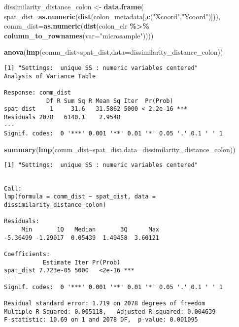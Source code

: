 \documentclass[
]{article}
\newenvironment{Shaded}{\begin{snugshade}}{\end{snugshade}}
\newcommand{\AttributeTok}[1]{\textcolor[rgb]{0.13,0.29,0.53}{#1}}
\newcommand{\FunctionTok}[1]{\textcolor[rgb]{0.13,0.29,0.53}{\textbf{#1}}}
\newcommand{\NormalTok}[1]{#1}
\newcommand{\OtherTok}[1]{\textcolor[rgb]{0.56,0.35,0.01}{#1}}
\newcommand{\SpecialCharTok}[1]{\textcolor[rgb]{0.81,0.36,0.00}{\textbf{#1}}}
\newcommand{\StringTok}[1]{\textcolor[rgb]{0.31,0.60,0.02}{#1}}
\begin{document}
\begin{Shaded}
\begin{Highlighting}[]
\NormalTok{dissimilarity\_distance\_colon }\OtherTok{\textless{}{-}} \FunctionTok{data.frame}\NormalTok{(}
        \AttributeTok{spat\_dist=}\FunctionTok{as.numeric}\NormalTok{(}\FunctionTok{dist}\NormalTok{(colon\_metadata[,}\FunctionTok{c}\NormalTok{(}\StringTok{"Xcoord"}\NormalTok{,}\StringTok{"Ycoord"}\NormalTok{)])),}
        \AttributeTok{comm\_dist=}\FunctionTok{as.numeric}\NormalTok{(}\FunctionTok{dist}\NormalTok{(colon\_clr }\SpecialCharTok{\%\textgreater{}\%} \FunctionTok{column\_to\_rownames}\NormalTok{(}\AttributeTok{var=}\StringTok{"microsample"}\NormalTok{)))) }

\FunctionTok{anova}\NormalTok{(}\FunctionTok{lmp}\NormalTok{(comm\_dist}\SpecialCharTok{\textasciitilde{}}\NormalTok{spat\_dist,}\AttributeTok{data=}\NormalTok{dissimilarity\_distance\_colon))}
\end{Highlighting}
\end{Shaded}

\begin{verbatim}
[1] "Settings:  unique SS : numeric variables centered"
Analysis of Variance Table

Response: comm_dist
            Df R Sum Sq R Mean Sq Iter  Pr(Prob)    
spat_dist    1     31.6   31.5862 5000 < 2.2e-16 ***
Residuals 2078   6140.1    2.9548                   
---
Signif. codes:  0 '***' 0.001 '**' 0.01 '*' 0.05 '.' 0.1 ' ' 1
\end{verbatim}

\begin{Shaded}
\begin{Highlighting}[]
\FunctionTok{summary}\NormalTok{(}\FunctionTok{lmp}\NormalTok{(comm\_dist}\SpecialCharTok{\textasciitilde{}}\NormalTok{spat\_dist,}\AttributeTok{data=}\NormalTok{dissimilarity\_distance\_colon))}
\end{Highlighting}
\end{Shaded}

\begin{verbatim}
[1] "Settings:  unique SS : numeric variables centered"
\end{verbatim}

\begin{verbatim}

Call:
lmp(formula = comm_dist ~ spat_dist, data = dissimilarity_distance_colon)

Residuals:
     Min       1Q   Median       3Q      Max 
-5.36499 -1.29017  0.05439  1.49458  3.60121 

Coefficients:
           Estimate Iter Pr(Prob)    
spat_dist 7.723e-05 5000   <2e-16 ***
---
Signif. codes:  0 '***' 0.001 '**' 0.01 '*' 0.05 '.' 0.1 ' ' 1

Residual standard error: 1.719 on 2078 degrees of freedom
Multiple R-Squared: 0.005118,   Adjusted R-squared: 0.004639 
F-statistic: 10.69 on 1 and 2078 DF,  p-value: 0.001095 
\end{verbatim}
\end{document}
